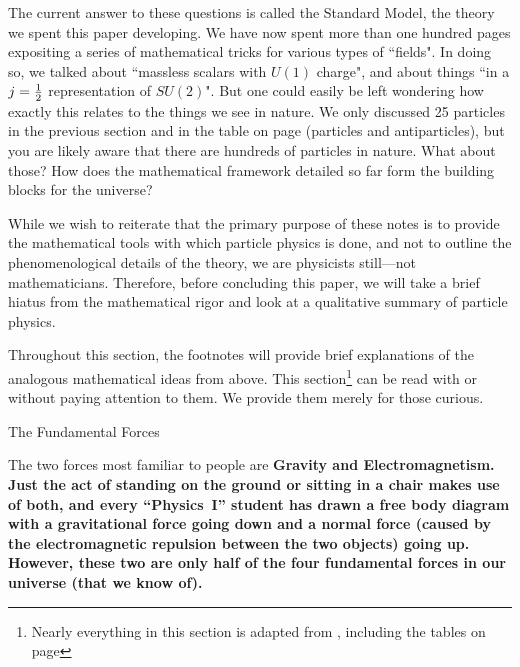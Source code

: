 \documentclass[12pt,epsf]{article}
\makeatletter
\def\subsection{\@startsection{subsection}{2}{\z@}{2.3ex plus .2ex}
 {2.3ex plus .2ex}{\bf}}
\makeatother
\begin{document}
The current answer to these questions is called the Standard Model, the
theory we spent this paper developing.	We have now spent more than one
hundred pages expositing a series of mathematical tricks for various
types of ``fields".  In doing so, we talked about ``massless scalars
with $U(1)$ charge", and about things ``in a $j={1\over 2}$
representation of $SU(2)$".  But one could easily be left wondering how
exactly this relates to the things we see in nature.  We only discussed
25 particles in the previous section and in the table on page
\pageref{standardmodelsummary} (particles and antiparticles), but you
are likely aware that there are hundreds of particles in nature.  What
about those?  How does the mathematical framework detailed so far form
the building blocks for the universe? 

While we wish to reiterate that the primary purpose of these notes is
to provide the mathematical tools with which particle physics is done,
and not to outline the phenomenological details of the theory, we are
physicists still---not mathematicians.  Therefore, before concluding
this paper, we will take a brief hiatus from the mathematical rigor and
look at a qualitative summary of particle physics. 

Throughout this section, the footnotes will provide brief explanations
of the analogous mathematical ideas from above.  This
section\footnote{Nearly everything in this section is adapted from
\cite{Dunlap}, including the tables on page \pageref{firsttab}} can be read with or without paying attention to
them.  We provide them merely for those curious. 

\subsection{The Fundamental Forces}

The two forces most familiar to people are \bf Gravity \rm and \bf
Electromagnetism\rm.  Just the act of standing on the ground or sitting
in a chair makes use of both, and every ``Physics~I'' student has drawn a
free body diagram with a gravitational force going down and a normal
force (caused by the electromagnetic repulsion between the two objects)
going up.  However, these two are only half of the four fundamental
forces in our universe (that we know of). 
\end{document}
